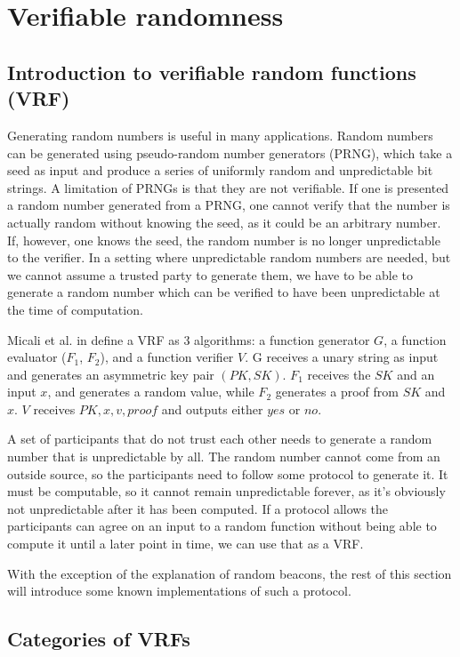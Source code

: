 \section{Verifiable randomness}
\label{sec:vrf}

\subsection{Introduction to verifiable random functions (VRF)}

Generating random numbers is useful in many applications. Random numbers can be generated using pseudo-random number generators (PRNG), which take a seed as input and produce a series of uniformly random and unpredictable bit strings. A limitation of PRNGs is that they are not verifiable. If one is presented a random number generated from a PRNG, one cannot verify that the number is actually random without knowing the seed, as it could be an arbitrary number. If, however, one knows the seed, the random number is no longer unpredictable to the verifier. In a setting where unpredictable random numbers are needed, but we cannot assume a trusted party to generate them, we have to be able to generate a random number which can be verified to have been unpredictable at the time of computation.

Micali et al. in \cite{micali_verifiable_1999} define a VRF as 3 algorithms: a function generator $G$, a function evaluator ($F_1$, $F_2$), and a function verifier $V$. G receives a unary string as input and generates an asymmetric key pair $(PK, SK)$. $F_1$ receives the $SK$ and an input $x$, and generates a random value, while $F_2$ generates a proof from $SK$ and $x$. $V$ receives $PK, x, v, proof$ and outputs either $yes$ or $no$.

A set of participants that do not trust each other needs to generate a random number that is unpredictable by all. The random number cannot come from an outside source, so the participants need to follow some protocol to generate it. It must be computable, so it cannot remain unpredictable forever, as it's obviously not unpredictable after it has been computed. If a protocol allows the participants can agree on an input to a random function without being able to compute it until a later point in time, we can use that as a VRF.

With the exception of the explanation of random beacons, the rest of this section will introduce some known implementations of such a protocol.

\subsection{Categories of VRFs}

